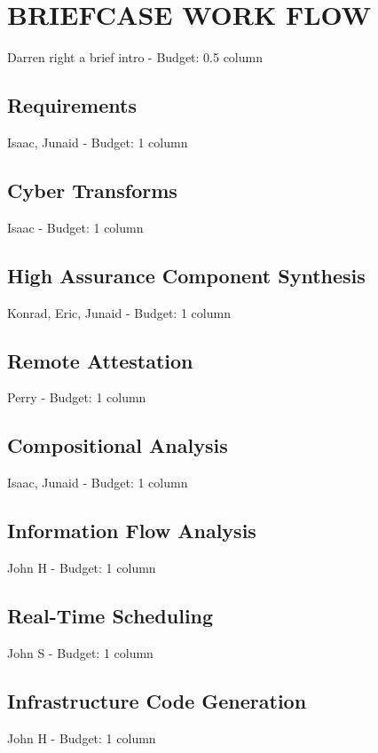 \documentclass{IEEEcsmag}
\begin{document}
\section{BRIEFCASE WORK FLOW}
Darren right a brief intro -  Budget: 0.5 column
\cite{OSATE}


\subsection{Requirements}
Isaac, Junaid -  Budget: 1 column
\cite{gearcase2020} \cite{dcrypps2019}

\subsection{Cyber Transforms}
Isaac -  Budget: 1 column

\subsection{High Assurance Component Synthesis}
Konrad, Eric, Junaid -  Budget: 1 column
\cite{case-verified-filter} \cite{hardin-co-assurance}
\cite{formal-filter-synth-langsec} \cite{contiguity-types} 

\subsection{Remote Attestation}
Perry -  Budget: 1 column
\cite{copland-attestation} \cite{copland-verification}

\subsection{Compositional Analysis}
Isaac, Junaid -  Budget: 1 column
\cite{case-models-2021}

\subsection{Information Flow Analysis}
John H -  Budget: 1 column

\subsection{Real-Time Scheduling}
John S -  Budget: 1 column

\subsection{Infrastructure Code Generation}
John H -  Budget: 1 column
\end{document}

